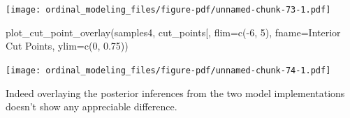\documentclass[
  letterpaper,
  DIV=11,
  numbers=noendperiod]{scrartcl}
\newenvironment{Shaded}{\begin{snugshade}}{\end{snugshade}}
\newcommand{\AttributeTok}[1]{\textcolor[rgb]{0.40,0.45,0.13}{#1}}
\newcommand{\ControlFlowTok}[1]{\textcolor[rgb]{0.00,0.23,0.31}{#1}}
\newcommand{\DecValTok}[1]{\textcolor[rgb]{0.68,0.00,0.00}{#1}}
\newcommand{\FloatTok}[1]{\textcolor[rgb]{0.68,0.00,0.00}{#1}}
\newcommand{\FunctionTok}[1]{\textcolor[rgb]{0.28,0.35,0.67}{#1}}
\newcommand{\NormalTok}[1]{\textcolor[rgb]{0.00,0.23,0.31}{#1}}
\newcommand{\OtherTok}[1]{\textcolor[rgb]{0.00,0.23,0.31}{#1}}
\newcommand{\SpecialCharTok}[1]{\textcolor[rgb]{0.37,0.37,0.37}{#1}}
\newcommand{\StringTok}[1]{\textcolor[rgb]{0.13,0.47,0.30}{#1}}
\begin{document}
\begin{Shaded}
\end{Shaded}

\texttt{[image: ordinal\_modeling\_files/figure-pdf/unnamed-chunk-73-1.pdf]}

\begin{Shaded}
\begin{Highlighting}[]
\FunctionTok{plot\_cut\_point\_overlay}\NormalTok{(samples4, }\StringTok{\textquotesingle{}cut\_points[\textquotesingle{}}\NormalTok{,}
                       \AttributeTok{flim=}\FunctionTok{c}\NormalTok{(}\SpecialCharTok{{-}}\DecValTok{6}\NormalTok{, }\DecValTok{5}\NormalTok{), }\AttributeTok{fname=}\StringTok{\textquotesingle{}Interior Cut Points\textquotesingle{}}\NormalTok{,}
                       \AttributeTok{ylim=}\FunctionTok{c}\NormalTok{(}\DecValTok{0}\NormalTok{, }\FloatTok{0.75}\NormalTok{))}
\end{Highlighting}
\end{Shaded}

\texttt{[image: ordinal\_modeling\_files/figure-pdf/unnamed-chunk-74-1.pdf]}

Indeed overlaying the posterior inferences from the two model
implementations doesn't show any appreciable difference.
\end{document}

